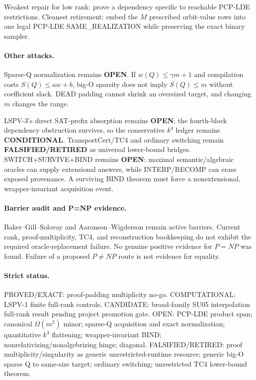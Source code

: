 \documentclass[11pt]{article}
\begin{document}
Weakest repair for low rank: prove a dependency specific to reachable PCP-LDE restrictions. Cleanest retirement: embed the $M$ prescribed orbit-value rows into one legal PCP-LDE SAME\_REALIZATION while preserving the exact binary sampler.

\paragraph{Other attacks.}
Sparse-Q normalization remains \textbf{OPEN}. If $w(Q)\le\gamma m+1$ and compilation costs $S(Q)\le aw+b$, big-O sparsity does not imply $S(Q)\le m$ without coefficient slack. DEAD padding cannot shrink an oversized target, and changing $m$ changes the range.

LSPV-3's direct SAT-prefix absorption remains \textbf{OPEN}; the fourth-block dependency obstruction survives, so the conservative $k^4$ ledger remains \textbf{CONDITIONAL}. TransportCert/TC4 and ordinary switching remain \textbf{FALSIFIED/RETIRED} as universal lower-bound bridges. SWITCH+SURVIVE+BIND remains \textbf{OPEN}: maximal semantic/algebraic oracles can supply extensional answers, while INTERP/RECOMP can erase exposed provenance. A surviving BIND theorem must force a nonextensional, wrapper-invariant acquisition event.

\paragraph{Barrier audit and P=NP evidence.}
Baker--Gill--Solovay and Aaronson--Wigderson remain active barriers. Current rank, proof-multiplicity, TC4, and reconstruction bookkeeping do not exhibit the required oracle-replacement failure. No genuine positive evidence for $P=NP$ was found. Failure of a proposed $P\ne NP$ route is not evidence for equality.

\paragraph{Strict status.}
PROVED/EXACT: proof-padding multiplicity no-go.
COMPUTATIONAL: LSPV-1 finite full-rank controls.
CANDIDATE: broad-family SU05 interpolation full-rank result pending project promotion gate.
OPEN: PCP-LDE product span; canonical $\Omega(m^2)$ minor; sparse-Q acquisition and exact normalization; quantitative $k^3$ flattening; wrapper-invariant BIND; nonrelativizing/nonalgebrizing hinge; diagonal.
FALSIFIED/RETIRED: proof multiplicity/singularity as generic unrestricted-runtime resource; generic big-O sparse Q to same-size target; ordinary switching; unrestricted TC4 lower-bound theorem.
\end{document}
